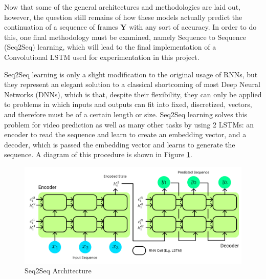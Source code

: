 \documentclass{scrartcl}
\begin{document}
Now that some of the general architectures and methodologies are laid out,
however, the question still remains of how these models actually predict the
continuation of a sequence of frames $\boldsymbol{Y}$ with any sort of
accuracy. In order to do this, one final methodology must be examined, namely
Sequence to Sequence (Seq2Seq) learning, which will lead to the final
implementation of a Convolutional LSTM used for experimentation in this
project.

Seq2Seq learning is only a slight modification to the original usage of RNNs,
but they represent an elegant solution to a classical shortcoming of most Deep
Neural Networks (DNNs), which is that, despite their flexibility, they can only
be applied to problems in which inputs and outputs can fit into fixed,
discretized, vectors, and therefore must be of a certain length or size.
Seq2Seq learning solves this problem for video prediction as well as many other
tasks by using 2 LSTMs: an encoder to read the sequence and learn to create an
embedding vector, and a decoder, which is passed the embedding vector and
learns to generate the sequence. A diagram of this procedure is shown in Figure
\ref{fig:seq2seq_arch}.

\begin{figure}[H]
	\begin{center}
		\includegraphics[width=1\textwidth]{figures/seq2seq_arch.png}
	\end{center}
	\caption{Seq2Seq Architecture}
	\label{fig:seq2seq_arch}
\end{figure}
\end{document}

